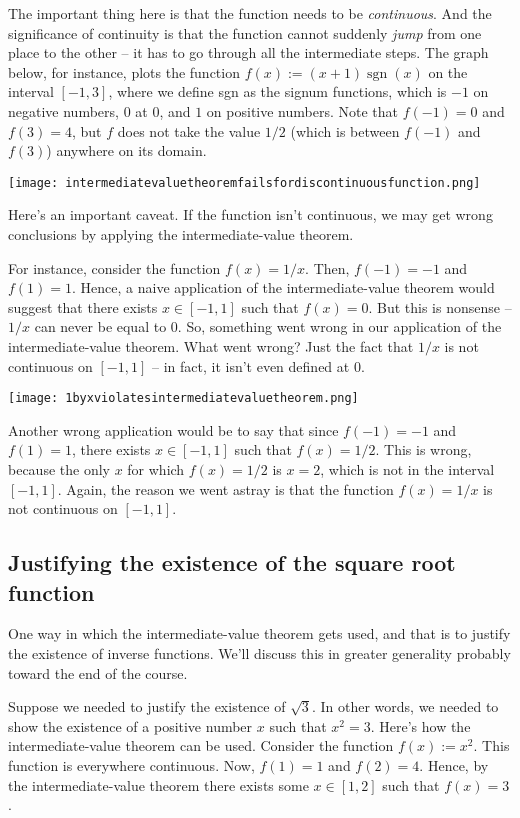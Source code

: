\documentclass[10pt]{amsart}
\begin{document}
The important thing here is that the function needs to be {\em
continuous}. And the significance of continuity is that the function
cannot suddenly {\em jump} from one place to the other -- it has to go
through all the intermediate steps. The graph below, for instance,
plots the function $f(x) := (x + 1)\operatorname{sgn}(x)$ on the
interval $[-1,3]$, where we define sgn as the signum functions, which
is $-1$ on negative numbers, $0$ at $0$, and $1$ on positive
numbers. Note that $f(-1) = 0$ and $f(3) = 4$, but $f$ does not take
the value $1/2$ (which is between $f(-1)$ and $f(3)$) anywhere on its
domain.

\texttt{[image: intermediatevaluetheoremfailsfordiscontinuousfunction.png]}

Here's an important caveat. If the function isn't continuous, we may
get wrong conclusions by applying the intermediate-value theorem.

For instance, consider the function $f(x) = 1/x$. Then, $f(-1) = -1$
and $f(1) = 1$. Hence, a naive application of the intermediate-value
theorem would suggest that there exists $x \in [-1,1]$ such that $f(x)
= 0$. But this is nonsense -- $1/x$ can never be equal to $0$. So,
something went wrong in our application of the intermediate-value
theorem. What went wrong? Just the fact that $1/x$ is not continuous
on $[-1,1]$ -- in fact, it isn't even defined at $0$.

\texttt{[image: 1byxviolatesintermediatevaluetheorem.png]}

Another wrong application would be to say that since $f(-1) = -1$ and
$f(1) = 1$, there exists $x \in [-1,1]$ such that $f(x) = 1/2$. This
is wrong, because the only $x$ for which $f(x) = 1/2$ is $x = 2$,
which is not in the interval $[-1,1]$. Again, the reason we went
astray is that the function $f(x) = 1/x$ is not continuous on
$[-1,1]$.

\subsection{Justifying the existence of the square root function}

One way in which the intermediate-value theorem gets used, and that is
to justify the existence of inverse functions. We'll discuss this in
greater generality probably toward the end of the course.

Suppose we needed to justify the existence of $\sqrt{3}$. In other
words, we needed to show the existence of a positive number $x$ such
that $x^2 = 3$. Here's how the intermediate-value theorem can be
used. Consider the function $f(x) := x^2$. This function is everywhere
continuous. Now, $f(1) = 1$ and $f(2) = 4$. Hence, by the
intermediate-value theorem there exists some $x \in [1,2]$ such that
$f(x) = 3$.
\end{document}

